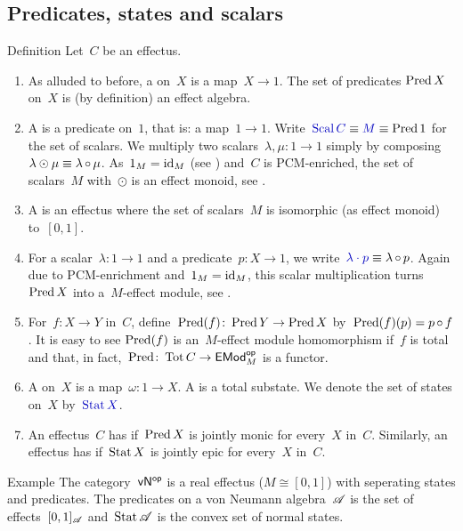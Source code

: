 \documentclass[b]{subfiles}
\begin{document}
\subsection{Predicates, states and scalars}
\begin{parsec}%
\begin{point}{Definition}%
Let~$C$ be an effectus.
\begin{enumerate}
\item
As alluded to before,
a  on~$X$ is a map~$X \to 1$.
The set of predicates $\operatorname{Pred} X$ on~$X$ is (by definition) an effect algebra.
\item
A  is a predicate on~$1$, that is: a map~$1 \to 1$.
Write~$\Define{\Scal C} \equiv \Define{M} \equiv \Pred 1$ for the set of scalars.
We multiply two scalars~$\lambda,\mu \colon 1 \to 1$
    simply by composing~$\lambda \odot \mu \equiv \lambda \mathop{\circ} \mu$.
As~$1_M = \operatorname{id}_M$ (see ) and~$C$ is PCM-enriched,
    the set of scalars~$M$ with~$\odot$
    is an effect monoid,
    see .
\item
A  is an effectus
where the set of scalars~$M$ is isomorphic (as effect monoid) to~$[0,1]$.
\item
For a scalar~$\lambda\colon 1\to 1$ and a predicate~$p\colon X \to 1$,
we write~$\Define{\lambda \cdot p} \equiv \lambda \after p$.
Again due to PCM-enrichment and~$1_M = \operatorname{id}_M$,
this scalar multiplication
turns~$\operatorname{Pred} X$ into a~$M$-effect module, see .
\item
For~$f\colon X \to Y$ in~$C$,
    define~$\operatorname{Pred}(f) \colon \operatorname{Pred} Y \to \operatorname{Pred} X$
    by~$\operatorname{Pred}(f)(p) = p \mathop{\circ} f$.
It is easy to see
$\operatorname{Pred}(f)$ is an~$M$-effect module homomorphism
if~$f$ is total
and that, in fact,~$\operatorname{Pred}\colon \operatorname{Tot} C \to \mathsf{EMod}^{\mathsf{op}}_M$
is a functor.
\item
A  on~$X$ is a map~$\omega\colon 1 \to X$.
A  is a total substate.
We denote the set of states on~$X$ by~$\Define{\Stat X}$.
\item
An effectus~$C$ has 
    if~$\operatorname{Pred} X$ is jointly monic for every~$X$ in~$C$.
    Similarly, an effectus has 
    if~$\operatorname{Stat} X$ is jointly epic for every~$X$ in~$C$.
\end{enumerate}
\end{point}
\begin{point}{Example}%
The category~${\mathsf{vN}}{^{\mathsf{op}}}$ is a real effectus ($M \cong [0,1]$)
    with seperating states and predicates.
The predicates on a von Neumann algebra~$\mathscr{A}$
    is the set of effects~$[0,1]_{\mathscr{A}}$
    and~$\operatorname{Stat} \mathscr{A}$ is the convex set of normal states.
\end{point}
\end{parsec}
\end{document}
